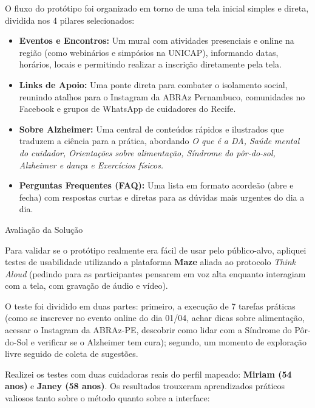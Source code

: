 \documentclass[11pt,a4paper]{article}
\newcommand{\subtituloSecao}[1]{%
  \par\addvspace{10pt}%
  {\noindent\fontsize{16pt}{20pt}\selectfont\normalfont\color{headingBlue}#1\par}%
  \vspace{3pt}%
}
\begin{document}
O fluxo do protótipo foi organizado em torno de uma tela inicial simples e direta, dividida nos 4 pilares selecionados:

\begin{itemize}[leftmargin=1.25cm, label=\textbullet, topsep=2pt, itemsep=6pt]
  \item \textbf{Eventos e Encontros:} Um mural com atividades presenciais e online na região (como webinários e simpósios na UNICAP), informando datas, horários, locais e permitindo realizar a inscrição diretamente pela tela.
  \item \textbf{Links de Apoio:} Uma ponte direta para combater o isolamento social, reunindo atalhos para o Instagram da ABRAz Pernambuco, comunidades no Facebook e grupos de WhatsApp de cuidadores do Recife.
  \item \textbf{Sobre Alzheimer:} Uma central de conteúdos rápidos e ilustrados que traduzem a ciência para a prática, abordando \textit{O que é a DA, Saúde mental do cuidador, Orientações sobre alimentação, Síndrome do pôr-do-sol, Alzheimer e dança e Exercícios físicos.}
  \item \textbf{Perguntas Frequentes (FAQ):} Uma lista em formato acordeão (abre e fecha) com respostas curtas e diretas para as dúvidas mais urgentes do dia a dia.
\end{itemize}

\subtituloSecao{Avaliação da Solução}

Para validar se o protótipo realmente era fácil de usar pelo público-alvo, apliquei testes de usabilidade utilizando a plataforma \textbf{Maze} aliada ao protocolo \textit{Think Aloud} (pedindo para as participantes pensarem em voz alta enquanto interagiam com a tela, com gravação de áudio e vídeo).

O teste foi dividido em duas partes: primeiro, a execução de 7 tarefas práticas (como se inscrever no evento online do dia 01/04, achar dicas sobre alimentação, acessar o Instagram da ABRAz-PE, descobrir como lidar com a Síndrome do Pôr-do-Sol e verificar se o Alzheimer tem cura); segundo, um momento de exploração livre seguido de coleta de sugestões.

Realizei os testes com duas cuidadoras reais do perfil mapeado: \textbf{Miriam (54 anos)} e \textbf{Janey (58 anos)}. Os resultados trouxeram aprendizados práticos valiosos tanto sobre o método quanto sobre a interface:
\end{document}
